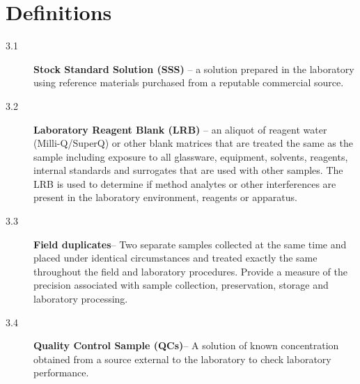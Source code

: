 \documentclass[12pt]{../SOP2}
\begin{document}
\section{Definitions}
\begin{description}
\item[3.1] \textbf{Stock Standard Solution (SSS)} -- a solution prepared in the laboratory using reference materials purchased from a reputable commercial source.
\item[3.2] \textbf{Laboratory Reagent Blank (LRB)} -- an aliquot of reagent water (Milli-Q/SuperQ) or other blank matrices that are treated the same as the sample including exposure to all glassware, equipment, solvents, reagents, internal standards and surrogates that are used with other samples. The LRB is used to determine if method analytes or other interferences are present in the laboratory environment, reagents or apparatus. 
\item[3.3]\textbf{Field duplicates}-- Two separate samples collected at the same time and placed under identical circumstances and treated exactly the same throughout the field and laboratory procedures. Provide a measure of the precision associated with sample collection, preservation, storage and laboratory processing. 
\item[3.4] \textbf{Quality Control Sample (QCs)}-- A solution of known concentration obtained from a source external to the laboratory to check laboratory performance.  
\end{description}
\end{document}
